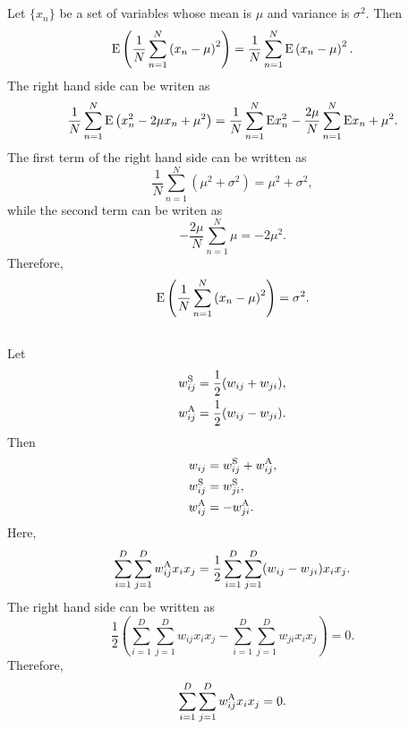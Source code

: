 \subsection{}
Let $\{ x_n \}$ be a set of variables whose mean is $\mu$ and variance is $\sigma ^ 2$.
Then
%
\begin{equation}
{\rm E} \left( \frac{1}{N} \sum_{n = 1}^{N} \left( x_n - \mu \right) ^ 2 \right) = \frac{1}{N} \sum_{n = 1}^{N} {\rm E} \left( x_n - \mu \right) ^ 2.
\end{equation}
%
The right hand side can be writen as 
%
\begin{equation}
\frac{1}{N} \sum_{n = 1}^{N} {\rm E} \left( x_n ^ 2 - 2 \mu x_n + \mu ^ 2 \right) = \frac{1}{N} \sum_{n = 1}^{N} {\rm E} x_n ^ 2 - \frac{2 \mu}{N}  \sum_{n = 1}^{N} {\rm E} x_n + \mu ^ 2.
\end{equation}
%
The first term of the right hand side can be written as 
%
\begin{equation}
\frac{1}{N} \sum_{n = 1}^{N} \left( \mu ^ 2 + \sigma ^ 2 \right) = \mu ^ 2 + \sigma ^ 2,
\end{equation}
%
while the second term can be writen as
%
\begin{equation}
- \frac{2 \mu}{N} \sum_{n = 1}^{N} \mu = - 2 \mu ^ 2.
\end{equation}
%
Therefore,
%
\begin{equation}
{\rm E} \left( \frac{1}{N} \sum_{n = 1}^{N} \left( x_n - \mu \right) ^ 2 \right) = \sigma ^2.
\end{equation}
%


\subsection{}
Let
%
\begin{equation}
\begin{aligned}
w_{ij}^{\rm S} &= \frac{1}{2} (w_{ij} + w_{ji}), \\
w_{ij}^{\rm A} &= \frac{1}{2} (w_{ij} - w_{ji}).
\end{aligned}
\end{equation}
%
Then
%
\begin{equation}
\begin{aligned}
w_{ij} &= w_{ij}^{\rm S} + w_{ij}^{\rm A}, \\
w_{ij}^{\rm S} &= w_{ji}^{\rm S}, \\
w_{ij}^{\rm A} &= - w_{ji}^{\rm A}.
\end{aligned}
\end{equation}
%
Here,
\begin{equation}
\sum_{i = 1}^{D} \sum_{j = 1}^{D} w_{ij}^{\rm A} x_i x_j = \frac{1}{2} \sum_{i = 1}^{D} \sum_{j = 1}^{D} (w_{ij} - w_{ji}) x_i x_j.
\end{equation}
%
The right hand side can be written as
%
\begin{equation}
\frac{1}{2} \left( \sum_{i = 1}^{D} \sum_{j = 1}^{D} w_{ij} x_i x_j - \sum_{i = 1}^{D} \sum_{j = 1}^{D} w_{ji} x_i x_j \right) = 0.
\end{equation}
%
Therefore, 
%
\begin{equation}
\sum_{i = 1}^{D} \sum_{j = 1}^{D} w_{ij}^{\rm A} x_i x_j = 0.
\end{equation}
%

